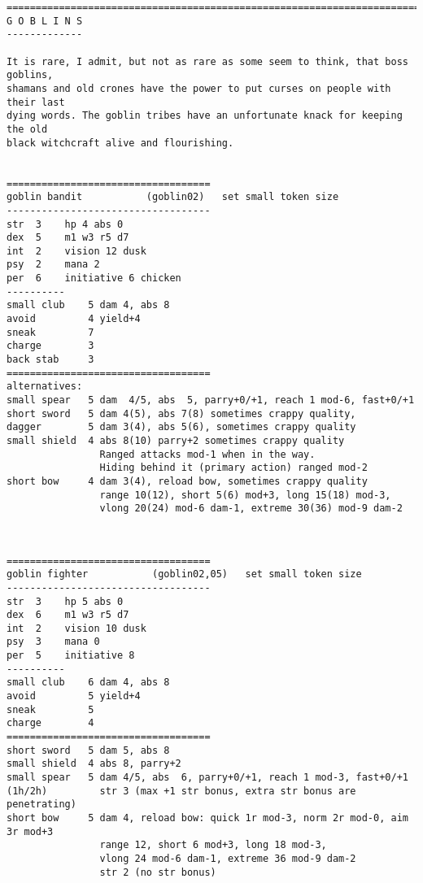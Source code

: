 \pagebreak[2]
\tiny \begin{samepage} \begin{verbatim}
================================================================================
G O B L I N S
-------------

It is rare, I admit, but not as rare as some seem to think, that boss goblins,
shamans and old crones have the power to put curses on people with their last
dying words. The goblin tribes have an unfortunate knack for keeping the old
black witchcraft alive and flourishing.


===================================
goblin bandit           (goblin02)   set small token size
-----------------------------------
str  3    hp 4 abs 0
dex  5    m1 w3 r5 d7
int  2    vision 12 dusk
psy  2    mana 2
per  6    initiative 6 chicken
----------
small club    5 dam 4, abs 8
avoid         4 yield+4
sneak         7
charge        3
back stab     3
===================================
alternatives:
small spear   5 dam  4/5, abs  5, parry+0/+1, reach 1 mod-6, fast+0/+1
short sword   5 dam 4(5), abs 7(8) sometimes crappy quality,
dagger        5 dam 3(4), abs 5(6), sometimes crappy quality
small shield  4 abs 8(10) parry+2 sometimes crappy quality
                Ranged attacks mod-1 when in the way.
                Hiding behind it (primary action) ranged mod-2
short bow     4 dam 3(4), reload bow, sometimes crappy quality
                range 10(12), short 5(6) mod+3, long 15(18) mod-3,
                vlong 20(24) mod-6 dam-1, extreme 30(36) mod-9 dam-2
\end{verbatim} \end{samepage} \normalsize

\

\pagebreak[1]
\tiny \begin{samepage} \begin{verbatim}
===================================
goblin fighter           (goblin02,05)   set small token size
-----------------------------------
str  3    hp 5 abs 0
dex  6    m1 w3 r5 d7
int  2    vision 10 dusk
psy  3    mana 0
per  5    initiative 8
----------
small club    6 dam 4, abs 8
avoid         5 yield+4
sneak         5
charge        4
===================================
short sword   5 dam 5, abs 8
small shield  4 abs 8, parry+2
small spear   5 dam 4/5, abs  6, parry+0/+1, reach 1 mod-3, fast+0/+1
(1h/2h)         str 3 (max +1 str bonus, extra str bonus are penetrating)
short bow     5 dam 4, reload bow: quick 1r mod-3, norm 2r mod-0, aim 3r mod+3
                range 12, short 6 mod+3, long 18 mod-3,
                vlong 24 mod-6 dam-1, extreme 36 mod-9 dam-2
                str 2 (no str bonus)
\end{verbatim} \end{samepage} \normalsize

